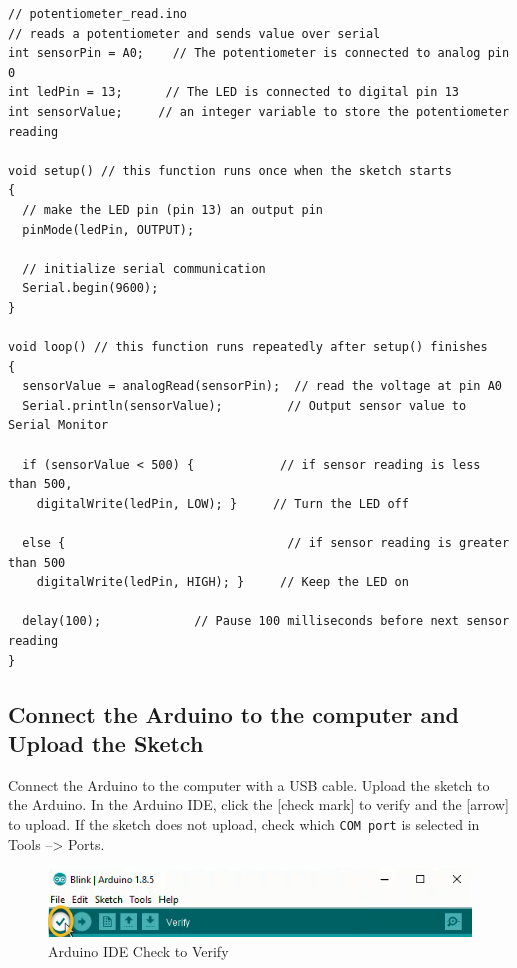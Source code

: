 \documentclass{book}
\makeatletter
\def\maxwidth{\ifdim\Gin@nat@width>\linewidth\linewidth
    \else\Gin@nat@width\fi}
\let\Oldincludegraphics\includegraphics
\renewcommand{\includegraphics}[1]{\Oldincludegraphics[width=.8\maxwidth]{#1}}
\makeatother
\begin{document}
    
        \begin{lstlisting}
// potentiometer_read.ino
// reads a potentiometer and sends value over serial
int sensorPin = A0;    // The potentiometer is connected to analog pin 0                  
int ledPin = 13;      // The LED is connected to digital pin 13
int sensorValue;     // an integer variable to store the potentiometer reading

void setup() // this function runs once when the sketch starts
{
  // make the LED pin (pin 13) an output pin
  pinMode(ledPin, OUTPUT);

  // initialize serial communication
  Serial.begin(9600);
}

void loop() // this function runs repeatedly after setup() finishes
{
  sensorValue = analogRead(sensorPin);  // read the voltage at pin A0   
  Serial.println(sensorValue);         // Output sensor value to Serial Monitor
  
  if (sensorValue < 500) {            // if sensor reading is less than 500,
    digitalWrite(ledPin, LOW); }     // Turn the LED off
  
  else {                               // if sensor reading is greater than 500
    digitalWrite(ledPin, HIGH); }     // Keep the LED on
  
  delay(100);             // Pause 100 milliseconds before next sensor reading
}
\end{lstlisting}
    




    
        \subsection{Connect the Arduino to the computer and Upload the
Sketch}\label{connect-the-arduino-to-the-computer-and-upload-the-sketch}
    




    
        Connect the Arduino to the computer with a USB cable. Upload the sketch
to the Arduino. In the Arduino IDE, click the {[}check mark{]} to verify
and the {[}arrow{]} to upload. If the sketch does not upload, check
which \lstinline!COM port! is selected in Tools --\textgreater{} Ports.

\begin{figure}
\centering
\includegraphics{images/Check_to_Verify.png}
\caption{Arduino IDE Check to Verify}
\end{figure}
\end{document}
